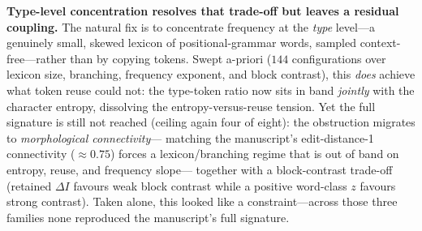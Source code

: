 \documentclass[11pt]{article}
\begin{document}
\textbf{Type-level concentration resolves that trade-off but leaves a residual coupling.}
The natural fix is to concentrate frequency at the \emph{type} level---a genuinely small,
skewed lexicon of positional-grammar words, sampled context-free---rather than by copying
tokens. Swept a-priori ($144$ configurations over lexicon size, branching, frequency
exponent, and block contrast), this \emph{does} achieve what token reuse could not: the
type-token ratio now sits in band \emph{jointly} with the character entropy, dissolving
the entropy-versus-reuse tension. Yet the full signature is still not reached (ceiling
again four of eight): the obstruction migrates to \emph{morphological connectivity}---
matching the manuscript's edit-distance-1 connectivity ($\approx 0.75$) forces a
lexicon/branching regime that is out of band on entropy, reuse, and frequency slope---
together with a block-contrast trade-off (retained $\Delta I$ favours weak block contrast
while a positive word-class $z$ favours strong contrast). Taken alone, this looked like a
constraint---across those three families none reproduced the manuscript's full signature.
\end{document}
